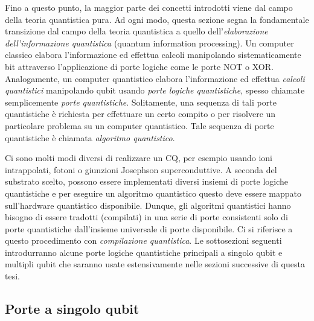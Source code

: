 Fino a questo punto, la maggior parte dei concetti introdotti viene dal campo 
della teoria quantistica pura. Ad ogni modo, questa sezione segna la fondamentale 
transizione dal campo della teoria quantistica a quello dell'\emph{elaborazione 
dell'informazione quantistica} (quantum information processing). Un computer 
classico elabora l'informazione ed effettua calcoli manipolando sistematicamente 
bit attraverso l'applicazione di porte logiche come le porte NOT o XOR. 
Analogamente, un computer quantistico elabora l'informazione ed effettua 
\emph{calcoli quantistici} manipolando qubit usando \emph{porte logiche 
quantistiche}, spesso chiamate semplicemente \emph{porte quantistiche}. 
Solitamente, una sequenza di tali porte quantistiche è richiesta per effettuare 
un certo compito o per risolvere un particolare problema su un computer 
quantistico. Tale sequenza di porte quantistiche è chiamata \emph{algoritmo 
quantistico}. 

Ci sono molti modi diversi di realizzare un \ac{CQ}, per esempio usando ioni 
intrappolati, fotoni o giunzioni Josephson superconduttive. %
A seconda del substrato scelto, possono essere implementati diversi insiemi di 
porte logiche quantistiche e per eseguire un algoritmo quantistico questo deve 
essere mappato sull'hardware quantistico disponibile. Dunque, gli algoritmi 
quantistici hanno bisogno di essere tradotti (compilati) in una serie di porte 
consistenti solo di porte quantistiche dall'insieme universale di porte 
disponibile. Ci si riferisce a questo procedimento con \emph{compilazione 
quantistica}. Le sottosezioni seguenti introdurranno alcune porte logiche 
quantistiche principali a singolo qubit e multipli qubit che saranno usate 
estensivamente nelle sezioni successive di questa tesi. 

\subsection{Porte a singolo qubit}

